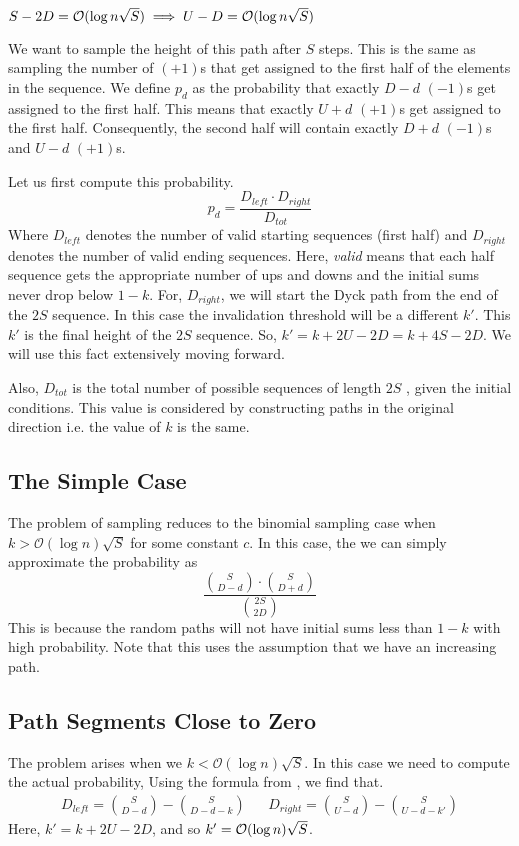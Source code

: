 \begin{lemma}
$S-2D = \Bo(\log n\sqrt S) \implies U-D = \Bo(\log n\sqrt S)$
\label{lem:dyck_var0}
\end{lemma}

We want to sample the height of this path after $S$ steps.
This is the same as sampling the number of $(+1)$s that get assigned to the first half of the elements in the sequence.
We define $p_d$ as the probability that exactly $D-d$ $(-1)$s get assigned to the first half.
This means that exactly $U+d$ $(+1)$s get assigned to the first half.
Consequently, the second half will contain exactly $D+d$ $(-1)$s and $U-d$ $(+1)$s.

Let us first compute this probability.
$$
p_d = \frac{D_{left}\cdot D_{right}}{D_{tot}}
$$
Where $D_{left}$ denotes the number of valid starting sequences (first half)
and $D_{right}$ denotes the number of valid ending sequences.
Here, \textit{valid} means that each half sequence gets the appropriate number of ups and downs
and the initial sums never drop below $1-k$.
For, $D_{right}$, we will start the Dyck path from the end of the $2S$ sequence.
In this case the invalidation threshold will be a different $k'$.
This $k'$ is the final height of the $2S$ sequence. So, $k'=k+2U-2D = k+4S-2D$. We will use this fact extensively moving forward.

Also, $D_{tot}$ is the total number of possible sequences of length $2S$ , given the initial conditions.
This value is considered by constructing paths in the original direction i.e. the value of $k$ is the same.

\subsection{The Simple Case}
The problem of sampling reduces to the binomial sampling case when $k > \mathcal{O}(\log n)\sqrt S$ for some constant $c$.
In this case, the we can simply approximate the probability as
$$
\frac{{{S}\choose{D-d}}\cdot{{S}\choose{D+d}}}{{{2S}\choose{2D}}}
$$
This is because the random paths will not have initial sums less than $1-k$ with high probability.
Note that this uses the assumption that we have an increasing path.

\subsection{Path Segments Close to Zero}
The problem arises when we $k <\mathcal{O}(\log n)\sqrt{S}$. In this case we need to compute the actual probability,
Using the formula from \cite{trap}, we find that.
\begin{align}
D_{left} = {{S}\choose{D-d}}-{{S}\choose{D-d-k}} &&D_{right} = {{S}\choose{U-d}}-{{S}\choose{U-d-k'}}
\end{align}
Here, $k' = k+2U-2D$, and so $k' = \Bo(\log n)\sqrt S$.

